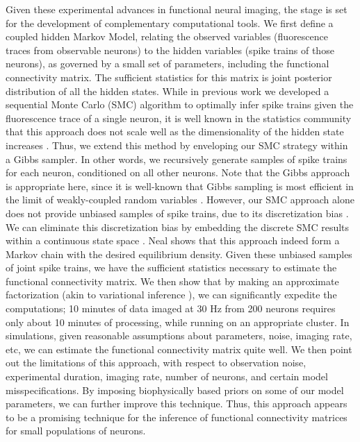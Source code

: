Given these experimental advances in functional neural imaging, the stage is set for the development of complementary computational tools.  We first define a coupled hidden Markov Model, relating the observed variables (fluorescence traces from observable neurons) to the hidden variables (spike trains of those neurons), as governed by a small set of parameters, including the functional connectivity matrix.  The sufficient statistics for this matrix is joint posterior distribution of all the hidden states.  While in previous work \cite{VogPan09} we developed a sequential Monte Carlo (SMC) algorithm to optimally infer spike trains given the fluorescence trace of a single neuron, it is well known in the statistics community that this approach does not scale well as the dimensionality of the hidden state increases \cite{DFG01}.  Thus, we extend this method by enveloping our SMC strategy within a Gibbs sampler.  In other words, we recursively generate samples of spike trains for each neuron, conditioned on all other neurons.  Note that the Gibbs approach is appropriate here, since it is well-known that Gibbs sampling is most efficient in the limit of weakly-coupled random variables \cite{Gelman03, RC05}.  However, our SMC approach alone does not provide unbiased samples of spike trains, due to its discretization bias \cite{DFG01}.  We can eliminate this discretization bias by embedding the discrete SMC results within a continuous state space \cite{Neal03}.  Neal \cite{NBR03} shows that this approach indeed form a Markov chain with the desired equilibrium density.  Given these unbiased samples of joint spike trains, we have the sufficient statistics necessary to estimate the functional connectivity matrix.  We then show that by making an approximate factorization (akin to variational inference \cite{WainwrightJordan08}), we can significantly expedite the computations; 10 minutes of data imaged at 30 Hz from 200 neurons  requires only about 10 minutes of processing, while running on an appropriate cluster.  In simulations, given reasonable assumptions about parameters, noise, imaging rate, etc, we can estimate the functional connectivity matrix quite well. We then point out the limitations of this approach, with respect to observation noise, experimental duration, imaging rate, number of neurons, and certain  model misspecifications.  By imposing biophysically based priors on some of our model parameters, we can further improve this technique.  Thus, this approach appears to be a promising technique for the inference of functional connectivity matrices for small populations of neurons.  